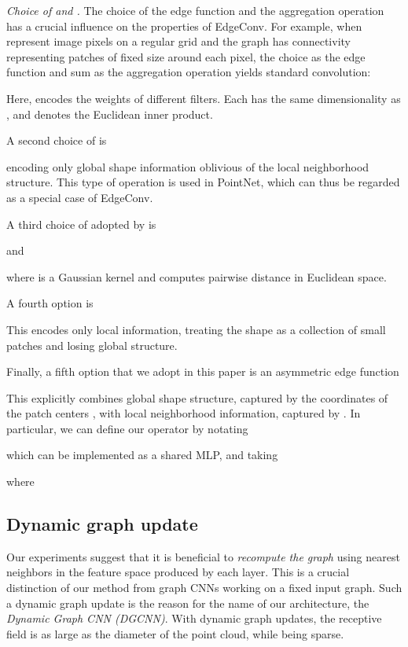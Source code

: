 \documentclass[acmtog]{acmart}
\begin{document}
\textit{Choice of  and .}
The choice of the edge function and the aggregation operation has a crucial influence on the properties of EdgeConv.
For example, when  represent image pixels on a regular grid and the graph  has connectivity representing patches of fixed size around each pixel, the choice  as the edge function and sum as the aggregation operation yields standard convolution:

Here,  encodes the weights of  different filters. Each  has the same dimensionality as , and  denotes the Euclidean inner product. 

A second  choice of  is 

encoding only global shape information oblivious of the local neighborhood structure. This type of operation is used in PointNet, which can thus be regarded as a special case of EdgeConv. 

A third choice of  adopted by \citet{pcnn2018} is 

and

where  is a Gaussian kernel and  computes pairwise distance in Euclidean space. 

A fourth option is 

This encodes only local information, treating the shape as a collection of small patches and losing global structure. 

Finally, a fifth option that we adopt in this paper is an asymmetric edge function 

This explicitly combines global shape structure, captured by the coordinates of the patch centers , with local neighborhood information, captured by . In particular, we can define our operator by notating
 
which can be implemented as a shared MLP, and taking

where 


\subsection{Dynamic graph update} 
Our experiments suggest that it is beneficial to \textit{recompute the graph} using nearest neighbors in the feature space produced by each layer. This is a crucial distinction of our method from graph CNNs working on a fixed input graph. Such a dynamic graph update is the reason for the name of our architecture, the \textit{Dynamic Graph CNN (DGCNN)}. With dynamic graph updates, the receptive field is as large as the diameter of the point cloud, while being sparse.
\end{document}
